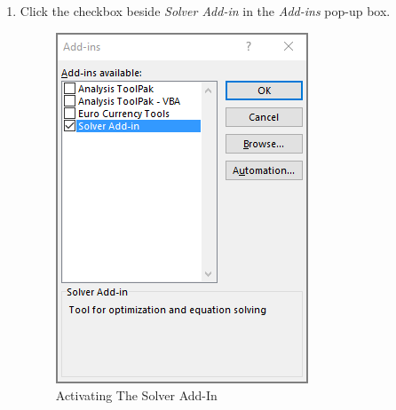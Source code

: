 \begin{enumbox}
\begin{enumerate}
		\item Click the checkbox beside \textit{Solver Add-in} in the \textit{Add-ins} pop-up box.
	
		\begin{figure}[H]
			\centering
			\includegraphics[width=\maxwidth{.65\linewidth}]{gfx/ch08_fig72}
			\caption{Activating The Solver Add-In}
			\label{08:fig72}
		\end{figure}


\end{enumerate}
\end{enumbox}

